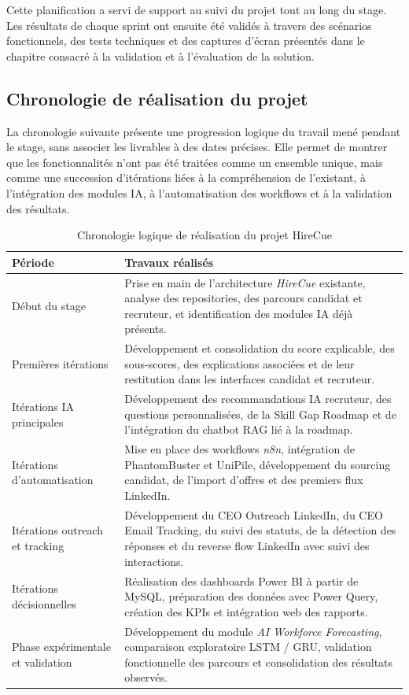 Cette planification a servi de support au suivi du projet tout au long du stage. Les résultats de chaque sprint ont ensuite été validés à travers des scénarios fonctionnels, des tests techniques et des captures d'écran présentés dans le chapitre consacré à la validation et à l'évaluation de la solution.

\subsection{Chronologie de réalisation du projet}

La chronologie suivante présente une progression logique du travail mené pendant le stage, sans associer les livrables à des dates précises. Elle permet de montrer que les fonctionnalités n'ont pas été traitées comme un ensemble unique, mais comme une succession d'itérations liées à la compréhension de l'existant, à l'intégration des modules IA, à l'automatisation des workflows et à la validation des résultats.

\begin{table}[H]
\centering
\small
\renewcommand{\arraystretch}{1.25}
\begin{tabular}{|p{4cm}|p{10cm}|}
\hline
\rowcolor{TableHeaderBlue}
\textbf{Période} & \textbf{Travaux réalisés} \\
\hline
Début du stage & Prise en main de l'architecture \textit{HireCue} existante, analyse des repositories, des parcours candidat et recruteur, et identification des modules IA déjà présents. \\
\hline
Premières itérations & Développement et consolidation du score explicable, des sous-scores, des explications associées et de leur restitution dans les interfaces candidat et recruteur. \\
\hline
Itérations IA principales & Développement des recommandations IA recruteur, des questions personnalisées, de la Skill Gap Roadmap et de l'intégration du chatbot RAG lié à la roadmap. \\
\hline
Itérations d'automatisation & Mise en place des workflows \textit{n8n}, intégration de PhantomBuster et UniPile, développement du sourcing candidat, de l'import d'offres et des premiers flux LinkedIn. \\
\hline
Itérations outreach et tracking & Développement du CEO Outreach LinkedIn, du CEO Email Tracking, du suivi des statuts, de la détection des réponses et du reverse flow LinkedIn avec suivi des interactions. \\
\hline
Itérations décisionnelles & Réalisation des dashboards Power BI à partir de MySQL, préparation des données avec Power Query, création des KPIs et intégration web des rapports. \\
\hline
Phase expérimentale et validation & Développement du module \textit{AI Workforce Forecasting}, comparaison exploratoire LSTM / GRU, validation fonctionnelle des parcours et consolidation des résultats observés. \\
\hline
\end{tabular}
\normalsize
\caption{Chronologie logique de réalisation du projet HireCue}
\end{table}

